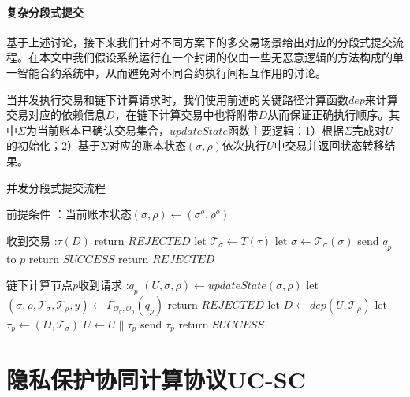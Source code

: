 \paragraph{复杂分段式提交} 基于上述讨论，接下来我们针对不同方案下的多交易场景给出对应的分段式提交流程。在本文中我们假设系统运行在一个封闭的仅由一些无恶意逻辑的方法构成的单一智能合约系统中，从而避免对不同合约执行间相互作用的讨论。

当并发执行交易和链下计算请求时，我们使用前述的关键路径计算函数$dep$来计算交易对应的依赖信息$D$，在链下计算交易中也将附带$D$从而保证正确执行顺序。其中$\Sigma$为当前账本已确认交易集合，$updateState$函数主要逻辑：1）根据$\Sigma$完成对$U$的初始化；2）基于$\Sigma$对应的账本状态$(\sigma, \rho)$依次执行$U$中交易并返回状态转移结果。

\begin{breakablealgorithm}
    \caption{并发分段式提交流程}
    \label{alg:ch3-8}
    \begin{algorithmic} 
        \item[前提条件]：当前账本状态$(\sigma, \rho) \leftarrow (\sigma^o, \rho^o)$
        \item[收到交易]:$\tau(D)$
        \STATE return $REJECTED$
        \ENDIF
        \STATE let $\mathcal{T}_\sigma \leftarrow T(\tau)$
        \STATE let $\sigma \leftarrow \mathcal{T}_\sigma(\sigma)$
        \STATE send $q_p$ to $p$
        \ENDFOR
        \STATE return $SUCCESS$
        \ENDIF
        \STATE return $REJECTED$
        \item[链下计算节点$p$收到请求]:$q_p$
        \STATE $(U, \sigma, \rho) \leftarrow updateState(\sigma, \rho)$
        \STATE let $(\sigma, \rho, \mathcal{T}_\sigma, \mathcal{T}_\rho, y) \leftarrow \Gamma_{\mathcal{O}_\sigma, \mathcal{O}_\rho}(q_p)$
        \IF {$\sigma = \perp \vee \rho = \perp$} 
        \STATE return $REJECTED$
        \ENDIF
        \STATE let $D \leftarrow dep(U, \mathcal{T}_\rho)$
        \STATE let $\tau_p \leftarrow (D, \mathcal{T}_\sigma)$
        \STATE $U \leftarrow U \parallel \tau_p$
        \STATE send $\tau_p$
        \STATE return $SUCCESS$
    \end{algorithmic}
\end{breakablealgorithm}

\section{隐私保护协同计算协议UC-SC}
